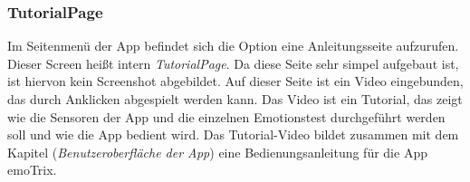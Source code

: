 \subsubsection{TutorialPage}
Im Seitenmenü der App befindet sich die Option eine Anleitungsseite aufzurufen. Dieser Screen heißt intern \textit{TutorialPage}. Da diese Seite sehr simpel aufgebaut ist, ist hiervon kein Screenshot abgebildet. \newline
Auf dieser Seite ist ein Video eingebunden, das durch Anklicken abgespielt werden kann. Das Video ist ein Tutorial, das zeigt wie die Sensoren der App und die einzelnen Emotionstest durchgeführt werden soll und wie die App bedient wird. Das Tutorial-Video bildet zusammen mit dem Kapitel (\textit{Benutzeroberfläche der App}) eine Bedienungsanleitung für die App emoTrix.